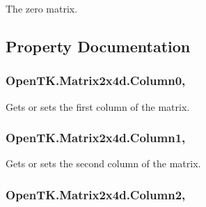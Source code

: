 The zero matrix. 



\subsection{Property Documentation}
\hypertarget{struct_open_t_k_1_1_matrix2x4d_a0cfdd9379a9b38530ba1f55462bab58c}{
\subsubsection[{Column0}]{ Open\-T\-K.\-Matrix2x4d.\-Column0\hspace{0.3cm}{\ttfamily [get]}, {\ttfamily [set]}}}\label{struct_open_t_k_1_1_matrix2x4d_a0cfdd9379a9b38530ba1f55462bab58c}


Gets or sets the first column of the matrix. 

\hypertarget{struct_open_t_k_1_1_matrix2x4d_aaaf480494a8e6c10c6cdff9b780a5626}{
\subsubsection[{Column1}]{ Open\-T\-K.\-Matrix2x4d.\-Column1\hspace{0.3cm}{\ttfamily [get]}, {\ttfamily [set]}}}\label{struct_open_t_k_1_1_matrix2x4d_aaaf480494a8e6c10c6cdff9b780a5626}


Gets or sets the second column of the matrix. 

\hypertarget{struct_open_t_k_1_1_matrix2x4d_afd2f0b4b60359c0acf03fbbe617743f7}{
\subsubsection[{Column2}]{ Open\-T\-K.\-Matrix2x4d.\-Column2\hspace{0.3cm}{\ttfamily [get]}, {\ttfamily [set]}}}\label{struct_open_t_k_1_1_matrix2x4d_afd2f0b4b60359c0acf03fbbe617743f7}


